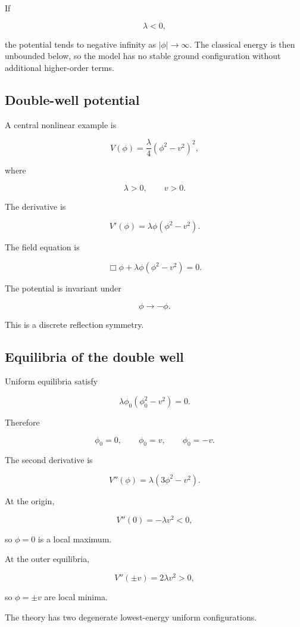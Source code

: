 If

\[
\lambda<0,
\]

the potential tends to negative infinity as \(|\phi|\to\infty\). The classical energy is then unbounded below, so the model has no stable ground configuration without additional higher-order terms.

\subsection{Double-well potential}

A central nonlinear example is

\[
\boxed{
V(\phi)
=
\frac{\lambda}{4}
(\phi^{2}-v^{2})^{2}
},
\]

where

\[
\lambda>0,
\qquad
v>0.
\]

The derivative is

\[
V'(\phi)
=
\lambda\phi
(\phi^{2}-v^{2}).
\]

The field equation is

\[
\boxed{
\Box\phi
+
\lambda\phi
(\phi^{2}-v^{2})
=0
}.
\]

The potential is invariant under

\[
\boxed{
\phi\longrightarrow-\phi
}.
\]

This is a discrete reflection symmetry.

\subsection{Equilibria of the double well}

Uniform equilibria satisfy

\[
\lambda\phi_{0}
(\phi_{0}^{2}-v^{2})=0.
\]

Therefore

\[
\boxed{
\phi_{0}=0,
\qquad
\phi_{0}=v,
\qquad
\phi_{0}=-v
}.
\]

The second derivative is

\[
V''(\phi)
=
\lambda(3\phi^{2}-v^{2}).
\]

At the origin,

\[
V''(0)
=
-\lambda v^{2}<0,
\]

so \(\phi=0\) is a local maximum.

At the outer equilibria,

\[
V''(\pm v)
=
2\lambda v^{2}>0,
\]

so \(\phi=\pm v\) are local minima.

The theory has two degenerate lowest-energy uniform configurations.

